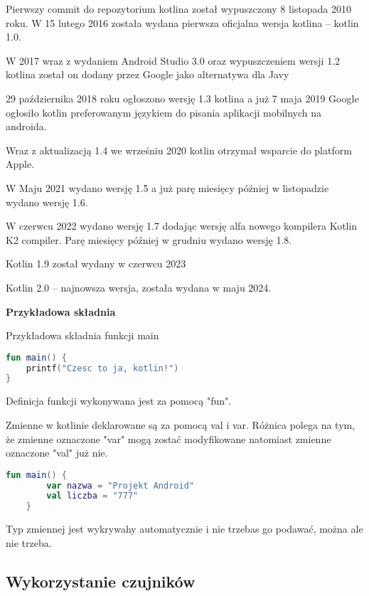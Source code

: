 Pierwszy commit do repozytorium kotlina został wypuszczony 8 listopada 2010 roku.
W 15 lutego 2016 została wydana pierwsza oficjalna wersja kotlina – kotlin 1.0.

W 2017 wraz z wydaniem Android Studio 3.0 oraz wypuszczeniem wersji 1.2 kotlina został on dodany przez Google jako alternatywa dla Javy

29 października 2018 roku ogłoszono wersję 1.3 kotlina a już 7 maja 2019 Google ogłosiło kotlin preferowanym językiem do pisania aplikacji mobilnych na androida.

Wraz z aktualizacją 1.4 we wrześniu 2020 kotlin otrzymał wsparcie do platform Apple.

W Maju 2021 wydano wersję 1.5 a już parę miesięcy później w listopadzie wydano wersję 1.6.

W czerwcu 2022 wydano wersję 1.7 dodając wersję alfa nowego kompilera Kotlin K2 compiler. Parę miesięcy później w grudniu wydano wersję 1.8.

Kotlin 1.9 został wydany w czerwcu 2023

Kotlin 2.0 – najnowsza wersja, została wydana w maju 2024.

\textbf{Przykładowa składnia}

Przykładowa składnia funkcji main
\begin{lstlisting}[caption=kotlin001 - Funkcje, label={lst:listing-k}, language=kotlin]
fun main() {
	printf("Czesc to ja, kotlin!")
}
\end{lstlisting}
Definicja funkcji wykonywana jest za pomocą "fun".

Zmienne w kotlinie deklarowane są za pomocą val i var. Różnica polega na tym, że zmienne oznaczone "var" mogą zostać modyfikowane natomiast zmienne oznaczone "val" już nie.

\begin{lstlisting}[caption=kotlin002 - Zmienne, label={lst:listing-k}, language=kotlin]
	fun main() {
		var nazwa = "Projekt Android"
		val liczba = "777"
	}
\end{lstlisting}

Typ zmiennej jest wykrywahy automatycznie i nie trzebas go podawać, można ale nie trzeba.

\subsection{Wykorzystanie czujników}

